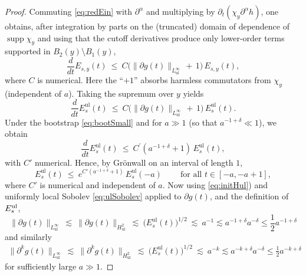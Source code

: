 \documentclass{amsart}
\newcommand{\supp}{\operatorname{supp}}
\begin{document}
{\begin{proof}
\smallskip
\noindent
Commuting \eqref{eq:redEin} with $\partial^\alpha$ and multiplying by $\partial_t(\chi_y\partial^\alpha h)$, one obtains,
after integration by parts on the (truncated) domain of dependence of $\supp\chi_y$ and using that the cutoff derivatives
produce only lower-order terms supported in $B_2(y)\setminus B_1(y)$,
\begin{equation}\label{eq:locEnergyIneq}
\frac{d}{dt}E_{s,y}(t)\ \le\ C\Big(\|\partial g(t)\|_{L^\infty_{\mathrm{ul}}}\,+\,1\Big)\,E_{s,y}(t),
\end{equation}
where $C$ is numerical. Here the ``$+1$'' absorbs harmless commutators from $\chi_y$ (independent of $a$).
Taking the supremum over $y$ yields
\begin{equation}\label{eq:ulEnergyIneq}
\frac{d}{dt}E_s^{\mathrm{ul}}(t)\ \le\ C\Big(\|\partial g(t)\|_{L^\infty_{\mathrm{ul}}}\,+\,1\Big)\,E_s^{\mathrm{ul}}(t).
\end{equation}
Under the bootstrap \eqref{eq:bootSmall} and for $a\gg 1$ (so that $a^{-1+\delta}\ll 1$), we obtain
\[
\frac{d}{dt}E_s^{\mathrm{ul}}(t)\ \le\ C^{'}(a^{-1+\delta}+1)\,E_s^{\mathrm{ul}}(t),
\]
with $C'$ numerical. Hence, by Grönwall on an interval of length $1$,
\begin{equation}\label{eq:EsulBound}
E_s^{\mathrm{ul}}(t)\ \le\ e^{C'(a^{-1+\delta}+1)}\,E_s^{\mathrm{ul}}(-a)\ \qquad\text{for all }t\in[-a,-a+1],
\end{equation}
where $C'$ is numerical and independent of $a$. Now using \eqref{eq:initHul})
and uniformly local Sobolev \eqref{eq:ulSobolev} applied to $\partial g(t)$, and the definition of $E_s^{\rm ul}$,
\begin{equation}\label{eq:dhFromE}
\|\partial g(t)\|_{L^\infty_{\mathrm{ul}}}\ \lesssim\ \|\partial g(t)\|_{H^{2}_{\mathrm{ul}}}
\ \lesssim\ \big(E_s^{\mathrm{ul}}(t)\big)^{1/2}\ \lesssim\ a^{-1}\lesssim a^{-1+\delta}a^{-\delta}\leq \frac{1}{2}a^{-1+\delta}
\end{equation}
and similarly 
\begin{align}
\|\partial^{k} g(t)\|_{L^\infty_{\mathrm{ul}}}\ \lesssim\ \|\partial^{k} g(t)\|_{H^{2}_{\mathrm{ul}}}
\ \lesssim\ \big(E_s^{\mathrm{ul}}(t)\big)^{1/2}\ \lesssim\ a^{-k}\lesssim a^{-k+\delta}a^{-\delta}\leq \frac{1}{2}a^{-k+\delta}    
\end{align}
for sufficiently large $a\gg1$.


\end{proof}}
\end{document}
